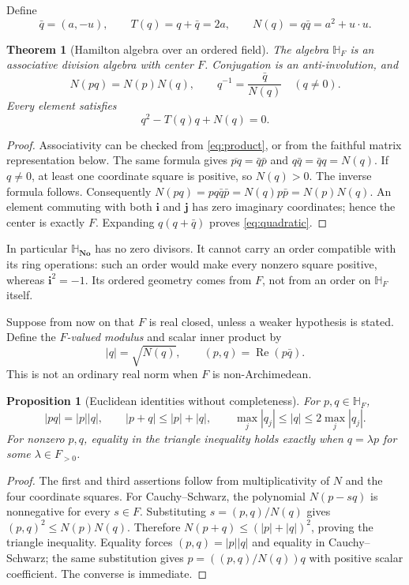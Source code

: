 \documentclass[11pt,letterpaper]{article}
\numberwithin{equation}{section}
\newtheorem{theorem}{Theorem}[section]
\newtheorem{proposition}[proposition]{Proposition}
\theoremstyle{definition}
\theoremstyle{remark}
\newcommand{\No}{\mathbf{No}}
\newcommand{\SQ}{\mathbb H_{\No}}
\newcommand{\HF}{\mathbb H_F}
\newcommand{\ii}{\mathbf i}
\newcommand{\jj}{\mathbf j}
\newcommand{\Rea}{\operatorname{Re}}
\begin{document}
Define
\[
 \bar q=(a,-u),\qquad T(q)=q+\bar q=2a,\qquad
 N(q)=q\bar q=a^2+u\cdot u.
\]

\begin{theorem}[Hamilton algebra over an ordered field]\label{thm:division}
The algebra $\HF$ is an associative division algebra with center $F$. Conjugation is an
anti-involution, and
\begin{equation}\label{eq:inverse}
 N(pq)=N(p)N(q),\qquad q^{-1}=\frac{\bar q}{N(q)}\quad(q\ne0).
\end{equation}
Every element satisfies
\begin{equation}\label{eq:quadratic}
 q^2-T(q)q+N(q)=0.
\end{equation}
\end{theorem}
\begin{proof}
Associativity can be checked from \eqref{eq:product}, or from the faithful matrix
representation below. The same formula gives $\overline{pq}=\bar q\bar p$ and
$q\bar q=\bar q q=N(q)$. If $q\ne0$, at least one coordinate square is positive, so $N(q)>0$.
The inverse formula follows. Consequently
$N(pq)=pq\bar q\bar p=N(q)p\bar p=N(p)N(q)$.
An element commuting with both $\ii$ and $\jj$ has zero imaginary coordinates; hence the
center is exactly $F$. Expanding $q(q+\bar q)$ proves \eqref{eq:quadratic}.
\end{proof}

In particular $\SQ$ has no zero divisors. It cannot carry an order compatible with its ring
operations: such an order would make every nonzero square positive, whereas $\ii^2=-1$.
Its ordered geometry comes from $F$, not from an order on $\HF$ itself.

Suppose from now on that $F$ is real closed, unless a weaker hypothesis is stated. Define the
\emph{$F$-valued modulus} and scalar inner product by
\[
 |q|=\sqrt{N(q)},\qquad (p,q)=\Rea(p\bar q).
\]
This is not an ordinary real norm when $F$ is non-Archimedean.

\begin{proposition}[Euclidean identities without completeness]\label{prop:norm}
For $p,q\in\HF$,
\[
 |pq|=|p||q|,\qquad |p+q|\le |p|+|q|,
 \qquad \max_j|q_j|\le |q|\le2\max_j|q_j|.
\]
For nonzero $p,q$, equality in the triangle inequality holds exactly when $q=\lambda p$
for some $\lambda\in F_{>0}$.
\end{proposition}
\begin{proof}
The first and third assertions follow from multiplicativity of $N$ and the four coordinate
squares. For Cauchy--Schwarz, the polynomial
$N(p-sq)$ is nonnegative for every $s\in F$. Substituting
$s=(p,q)/N(q)$ gives $(p,q)^2\le N(p)N(q)$.
Therefore $N(p+q)\le(|p|+|q|)^2$, proving the triangle inequality.
Equality forces $(p,q)=|p||q|$ and equality in Cauchy--Schwarz; the same substitution gives
$p=((p,q)/N(q))q$ with positive scalar coefficient. The converse is immediate.
\end{proof}
\end{document}
